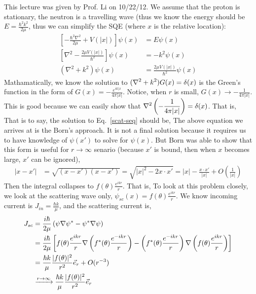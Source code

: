 \documentclass{school-22.101-notes}
\begin{document}
\label{born-appr}
This lecture was given by Prof. Li on 10/22/12. We assume that the proton is stationary, the neutron is a travelling wave (thus we know the energy should be $\displaystyle E = \frac{\hbar^2 k^2}{2\mu}$, thus we can simplify the SQE (where $x$ is the relative location): 
\begin{align}
\left[ - \frac{\hbar^2 \nabla^2}{2 \mu} + V(|x|) \right] \psi(x) &= E \psi(x) \\
\left[ \nabla^2 - \frac{2 \mu V(|x|)}{\hbar^2} \right] \psi(x) &= - k^2 \psi(x) \\
(\nabla^2 + k^2) \psi(x) &= \frac{2 \mu V(|x|)}{\hbar^2} \psi(x) \label{scat-seq}
\end{align}
Mathamatically, we know the solution to $\displaystyle (\nabla^2 + k^2) G(x) = \delta(x)$ is the Green's function in the form of $\displaystyle G(x) = - \frac{e^{ik|x}}{4 \pi |x|}$. Notice, when $r$ is small, $G(x) \to - \frac{1}{4 \pi |x|}$. This is good because we can easily show that $\displaystyle \nabla^2 \left( - \frac{1}{4 \pi |x|} \right) = \delta (x)$. That is, 
That is to say, the solution to Eq.~\ref{scat-seq} should be, 
The above equation we arrives at is the Born's approach. It is not a final solution because it requires us to have knowledge of $\psi(x')$ to solve for $\psi(x)$. But Born was able to show that this form is useful for $r\to \infty$ senario (because $x'$ is bound, then when $x$ becomes large, $x'$ can be ignored), 
\begin{align}
|x-x'| &= \sqrt{(x-x')(x-x')} = \sqrt{|x|^2 - 2x \cdot x'} = |x| - \frac{x \cdot x'}{|x|} + O\left( \frac{1}{|x|} \right) 
\end{align}
Then the integral collapses to $f(\theta) \frac{e^{ikr}}{r}$. That is, 
To look at this problem closely, we look at the scattering wave only, $\psi_{sc} (x) = f(\theta) \frac{e^{ikr}}{r}$. We know incoming current is $J_{in} = \frac{\hbar k}{\mu}$, and the scattering current is,
\begin{align}
J_{sc} &= \frac{i \hbar}{2\mu} \left( \psi \nabla \psi^* - \psi^* \nabla \psi \right) \\
&= \frac{i \hbar}{2\mu} \left[ f (\theta) \frac{e^{ikr}}{r} \nabla \left(f^* (\theta) \frac{e^{-ikr}}{r} \right)   - \left(f^* (\theta) \frac{e^{-ikr}}{r} \right) \nabla \left( f (\theta) \frac{e^{ikr}}{r} \right)    \right] \\
&= \frac{\hbar k}{\mu} \frac{|f(\theta)|^2}{r^2} \vec{e}_r  + O(r^{-3}) \\
&\xrightarrow{r\to \infty} \frac{\hbar k}{\mu} \frac{|f(\theta)|^2}{r^2} \vec{e}_r
\end{align}
\end{document}
